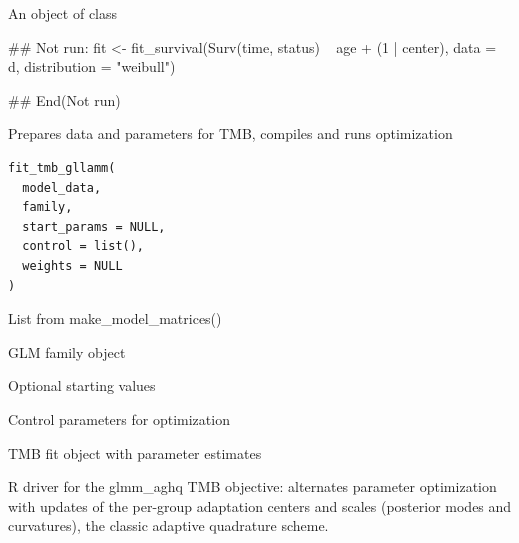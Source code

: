 \documentclass[a4paper]{book}
\begin{document}
%
\begin{Value}
An object of class 
\end{Value}
%
\begin{Examples}
\begin{ExampleCode}
## Not run: 
fit <- fit_survival(Surv(time, status) ~ age + (1 | center),
                    data = d, distribution = "weibull")

## End(Not run)

\end{ExampleCode}
\end{Examples}
%
\begin{Description}
Prepares data and parameters for TMB, compiles and runs optimization
\end{Description}
%
\begin{Usage}
\begin{verbatim}
fit_tmb_gllamm(
  model_data,
  family,
  start_params = NULL,
  control = list(),
  weights = NULL
)
\end{verbatim}
\end{Usage}
%
\begin{Arguments}
\begin{ldescription}
\item[\code{model\_data}] List from make\_model\_matrices()

\item[\code{family}] GLM family object

\item[\code{start\_params}] Optional starting values

\item[\code{control}] Control parameters for optimization
\end{ldescription}
\end{Arguments}
%
\begin{Value}
TMB fit object with parameter estimates
\end{Value}
%
\begin{Description}
R driver for the glmm\_aghq TMB objective: alternates parameter
optimization with updates of the per-group adaptation centers and scales
(posterior modes and curvatures), the classic adaptive quadrature scheme.
\end{Description}
\end{document}
